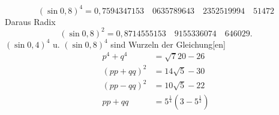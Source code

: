 \clearpage
{}
\[(\sin0{,}8)^4=0{,}7594347153\quad0635789643\quad2352519994\quad51472\]
\noindent Daraus Radix
\[(\sin0{,}8)^2=0{,}8714555153\quad9155336074\quad646029.\]
\noindent\((\sin0{,}4)^4\) u. \((\sin0{,}8)^4\) sind Wurzeln der Gleichung[en]
\[\begin{aligned}
p^4+q^4&=\surd720-26\\
(pp+qq)^2&=14\surd5-30\\
(pp-qq)^2&=10\surd5-22\\
pp+qq&=5^{\frac14}(3-5^{\frac12})
\end{aligned}\]
\endgroup
